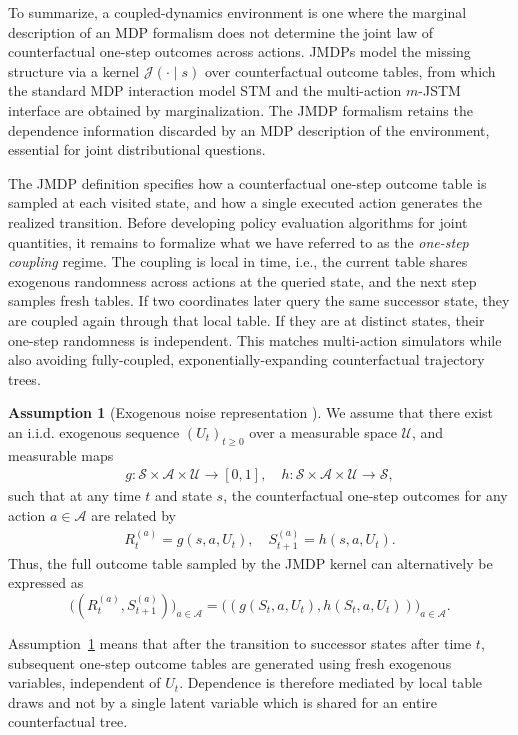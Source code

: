 \documentclass[accepted]{uai2026}
\theoremstyle{plain}
\theoremstyle{definition}
\newtheorem{assumption}[theorem]{Assumption}
\theoremstyle{remark}
\newcommand{\A}{\mathcal{A}}
\newcommand{\Ss}{\mathcal{S}}
\newcommand{\1}{\mathbbm{1}}
\begin{document}
To summarize, a coupled-dynamics environment is one where the marginal description of an MDP formalism does not determine the joint law of counterfactual one-step outcomes across actions. JMDPs model the missing structure via a kernel $\mathcal{J}(\cdot \mid s)$ over counterfactual outcome tables, from which the standard MDP interaction model STM and the multi-action $m$-JSTM interface are obtained by marginalization. The JMDP formalism retains the dependence information discarded by an MDP description of the environment, essential for joint distributional questions.

The JMDP definition specifies how a counterfactual one-step outcome table is sampled at each visited state, and how a single executed action generates the realized transition. Before developing policy evaluation algorithms for joint quantities, it remains to formalize what we have referred to as the \textit{one-step coupling} regime. The coupling is local in time, i.e., the current table shares exogenous randomness across actions at the queried state, and the next step samples fresh tables. If two coordinates later query the same successor state, they are coupled again through that local table. If they are at distinct states, their one-step randomness is independent. This matches multi-action simulators while also avoiding fully-coupled, exponentially-expanding counterfactual trajectory trees. 

\begin{assumption}[Exogenous noise representation \citep{bertsekas1996stochastic, ng2013pegasus}]\label{ass:exo}
We assume that there exist an i.i.d. exogenous sequence $(U_t)_{t\ge0}$ over a measurable space $\mathcal{U}$, and measurable maps
\begin{equation}
\begin{gathered}
g: \Ss \times \A \times \mathcal{U} \to [0, 1], \quad
h :\Ss \times \A \times \mathcal{U} \to \Ss,
\end{gathered}
\end{equation}
such that at any time $t$ and state $s$, the counterfactual one-step outcomes for any action $a \in \A$ are related by 
\begin{equation}
\begin{gathered}
R^{(a)}_t = g(s, a, U_t), \quad S^{(a)}_{t+1} = h(s, a, U_t).
\end{gathered}
\end{equation}
Thus, the full outcome table sampled by the JMDP kernel can alternatively be expressed as
\begin{equation}
\big((R_t^{(a)}, S^{(a)}_{t+1}) \big)_{a\in \A} = \big((g(S_t, a, U_t), h(S_t, a, U_t))\big)_{a\in \A}.
\end{equation}
\end{assumption}
Assumption~\ref{ass:exo} means that after the transition to successor states after time $t$, subsequent one-step outcome tables are generated using fresh exogenous variables, independent of $U_t$. Dependence is therefore mediated by local table draws and not by a single latent variable which is shared for an entire counterfactual tree.
\end{document}
